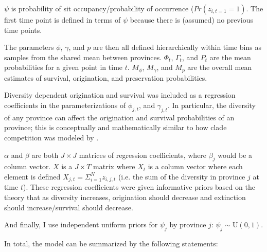 \documentclass[12pt,letterpaper]{article}
\begin{document}
\(\psi\) is probability of sit occupancy/probability of occurrence (\(Pr(z_{i, t = 1} = 1)\). The first time point is defined in terms of \(\psi\) because there is (assumed) no previous time points.

The parameters \(\phi\), \(\gamma\), and \(p\) are then all defined hierarchically within time bins as samples from the shared mean between provinces. \(\Phi_{t}\), \(\Gamma_{t}\), and \(P_{t}\) are the mean probabilities for a given point in time \(t\). \(M_{\phi}\), \(M_{\gamma}\), and \(M_{p}\) are the overall mean estimates of survival, origination, and preservation probabilities. 

Diversity dependent origination and survival was included as a regression coefficients in the parameterizations of \(\phi_{j, t}\), and \(\gamma_{j, t}\). In particular, the diversity of any province can affect the origination and survival probabilities of an province; this is conceptually and mathematically similar to how clade competition was modeled by \citet{Silvestro2015b}. 

\(\alpha\) and \(\beta\) are both \(J \times J\) matrices of regression coefficients, where \(\beta_{j}\) would be a column vector. \(X\) is a \(J \times T\) matrix where \(X_{t}\) is a column vector where each element is defined \(X_{j, t} = \Sigma_{i = 1}^{N} z_{i, j, t}\) (i.e. the sum of the diversity in province \(j\) at time \(t\)). These regression coefficients were given informative priors based on the theory that as diversity increases, origination should decrease and extinction should increase/survival should decrease.

And finally, I use independent uniform priors for \(\psi_{j}\) by province \(j\): \(\psi_{j} \sim \mathrm{U}(0, 1)\).

In total, the model can be summarized by the following statements:
\end{document}
